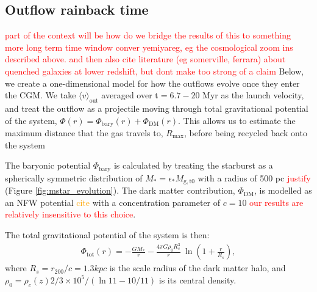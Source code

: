 \documentclass[twocolumn,linenumbers]{aastex631}
\begin{document}
{\subsection{Outflow rainback time}

\textcolor{red}{part of the context will be how do we bridge the results of this to something more long term time window conver yemiyareg, eg the cosmological zoom ins described above. and then also cite literature (eg somerville, ferrara) about quenched galaxies at lower redshift, but dont make too strong of a claim} Below, we create a one-dimensional model for how the outflows evolve once they enter the CGM. We take $\langle v\rangle _\mathrm{out}$ averaged over t$ =6.7 - 20$ Myr as the launch velocity, and treat the outflow as a projectile moving through total gravitational potential of the system, $\Phi (r) = \Phi_\mathrm{bary}(r) + \Phi_\mathrm{DM}(r)$. This allows us to estimate the maximum distance that the gas travels to, $R_\mathrm{max}$, before being recycled back onto the system 

The baryonic potential $\Phi_\mathrm{bary}$ is calculated by treating the starburst as a spherically symmetric distribution of $M_* = \epsilon_* M_\mathrm{g,t0}$ with a radius of 500 pc \textcolor{red}{justify} (Figure \ref{fig:mstar_evolution}). The dark matter contribution, $\Phi_\mathrm{DM}$, is modelled as an NFW potential \textcolor{orange}{cite} with a concentration parameter of $c=10$ \textcolor{red}{our results are relatively insensitive to this choice}. 

The total gravitational potential of the system is then: 
\begin{align}
\Phi_\mathrm{tot}(r) = - \frac{G M_*}{r} - \frac{4\pi G \rho_0 R_s^3}{r}\ \ln\left(1 + \frac{r}{R_s}\right),
\end{align}
where $R_s = r_{200}/c = 1.3kpc$ is the scale radius of the dark matter halo, and $\rho_0 = \rho_c(z)2/3 \times 10^5 /(\ln 11 - 10/11)$ is its central density.

}
\end{document}
